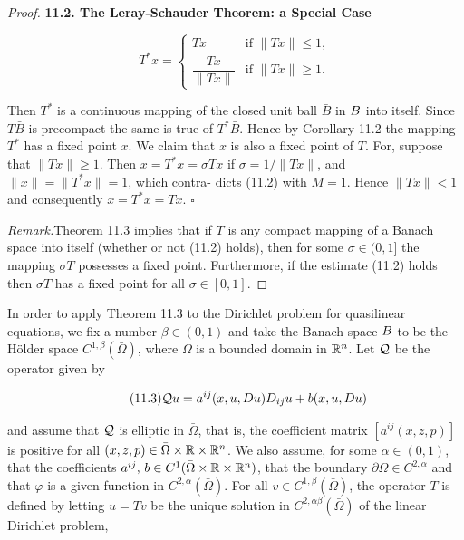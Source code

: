 \begin{proof}


\noindent\textbf{11.2. The Leray-Schauder Theorem: a Special Case}

\[
T^{*}x=
\begin{cases}
Tx & \text{if }\|Tx\|\leq 1,\\
\dfrac{Tx}{\|Tx\|} & \text{if }\|Tx\|\geq 1.
\end{cases}
\]

\noindent Then $T^{*}$ is a continuous mapping of the closed unit ball $\bar B$ in $B$ into itself. Since $T\bar B$
is precompact the same is true of $T^{*}\bar B$. Hence by Corollary 11.2 the mapping $T^{*}$
has a fixed point $x$. We claim that $x$ is also a fixed point of $T$. For, suppose that
$\|Tx\|\geq 1$. Then $x=T^{*}x=\sigma Tx$ if $\sigma=1/\|Tx\|$, and $\|x\|=\|T^{*}x\|=1$, which contra-
dicts (11.2) with $M=1$. Hence $\|Tx\|<1$ and consequently $x=T^{*}x=Tx$. $\square$

\medskip
\noindent\textit{Remark.}\quad Theorem 11.3 implies that if $T$ is any compact mapping of a Banach
space into itself (whether or not (11.2) holds), then for some $\sigma\in(0,1]$ the mapping
$\sigma T$ possesses a fixed point. Furthermore, if the estimate (11.2) holds then $\sigma T$ has a
fixed point for all $\sigma\in[0,1]$.
\end{proof}

\medskip
\noindent In order to apply Theorem 11.3 to the Dirichlet problem for quasilinear
equations, we fix a number $\beta\in(0,1)$ and take the Banach space $B$ to be the Hölder
space $C^{1,\beta}(\bar\Omega)$, where $\Omega$ is a bounded domain in $\mathbb{R}^n$. Let $\mathcal{Q}$ be the operator given by

\begin{equation}
\tag{11.3}
\mathcal{Q} u=a^{ij}(x,u,D u)D_{ij}u+b(x,u,D u)
\end{equation}

\noindent and assume that $\mathcal{Q}$ is elliptic in $\bar\Omega$, that is, the coefficient matrix $[a^{ij}(x,z,p)]$ is positive for all
$(x,z,p)\in\bar\Omega\times\mathbb{R}\times\mathbb{R}^n$. We also assume, for some $\alpha\in(0,1)$, that the
coefficients $a^{ij},\,b\in C^{1}(\bar\Omega\times\mathbb{R}\times\mathbb{R}^n)$, that the boundary $\partial\Omega\in C^{2,\alpha}$ and that $\varphi$ is a
given function in $C^{2,\alpha}(\bar\Omega)$. For all $v\in C^{1,\beta}(\bar\Omega)$, the operator $T$ is defined by letting
$u=Tv$ be the unique solution in $C^{2,\alpha\beta}(\bar\Omega)$ of the linear Dirichlet problem,

